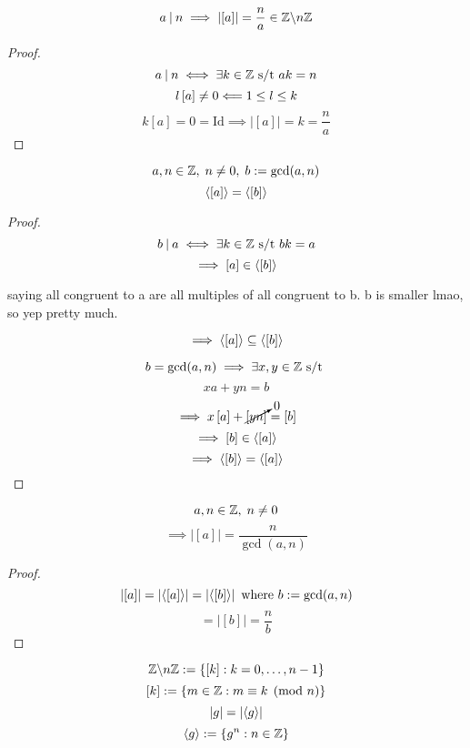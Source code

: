 \documentclass[12pt]{article}
\newcommand{\order}[1]{\left\lvert#1\right\rvert}
\newcommand{\divides}{\mathbin|}
\newcommand{\class}[1]{\left[#1\right]}
\newcommand{\id}[1][]{\mathrm{Id}}
\begin{document}
\bboxlem
\begin{lem}\ 
    \[
        a\divides n\implies\order{\class{a}}=\frac na\in\Z\backslash n\Z
    \]
\end{lem}
\ebox

\bboxproof
\begin{proof}
    \[
        a\divides n\iff\exists k\in\Z\st ak=n
    \]
    \[
        l\class{a}\neq 0\limplies1\le l\le k
    \]
    \[
        k\class{a}=0=\id\implies\order{\class{a}}=k=\frac na
    \]
\end{proof}
\ebox

\bboxlem
\begin{lem}
    \[
        a,n\in\mathbb Z,\;
        n\neq0,\;
        b:=\gcd(a,n)
    \]
    \[  %
        \gen{\class{a}}=\gen{\class{b}}
    \]
\end{lem}
\ebox

\bboxproof
\begin{proof}
    \[
        b\divides a\iff\exists k\in\Z\st bk=a
    \]
    \[%
        \implies\class{a}\in\gen{\class{b}}
    \]
    \bboxnote
    \begin{note}
        saying all congruent to a are all multiples of all congruent to b.
        b is smaller lmao, so yep pretty much.
    \end{note}
    \ebox
    \[
        \implies\gen{\class{a}}\subseteq\gen{\class{b}}
    \]

    \[
        b=\gcd(a,n)\implies\exists x,y\in\mathbb Z\text{ s/t }
    \]
    \[
        xa+yn=b
    \]
    \[
        \implies x\class{a}+\cancelto0{\class{yn}}=\class{b}
    \]
    \[
        \implies\class{b}\in\gen{\class{a}}
    \]
    \[
        \implies\gen{\class{b}}=\gen{\class{a}}
    \]
\end{proof}
\ebox

\bboxprop
\begin{prop}
    \[
        a,n\in\mathbb Z,\;n\neq 0
    \]
    \[
        \implies\order{\class{a}}=\frac n{\gcd(a,n)}
    \]
\end{prop}
\ebox
\bboxproof
\begin{proof}
    \[
        \order{\class{a}}=\order{\gen{\class{a}}}=\order{\gen{\class b}}\T{ where }
        b:=\gcd(a,n)
    \]
    \[
        =\order{\class{b}}=\frac nb
    \]
\end{proof}
\ebox


\bboxnote
\begin{note}\label{note:old}
    \[
        \Z\backslash n\Z:=\{\class{k}:k=0,\dots,n-1\}
    \]
    \[
        \class{k}:=\{m\in\Z:m\equiv k\pmod{n}\}
    \]
    \[
        \order{g}=\order{\gen{g}}
    \]
    \[
        \left\langle g\right\rangle:=\{g^n:n\in\mathbb Z\}
    \]
\end{note}
\ebox
\end{document}
